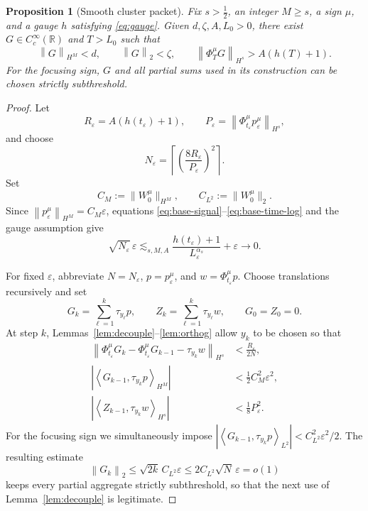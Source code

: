 \documentclass[10pt,a4paper]{amsart}
\numberwithin{equation}{section}
\newtheorem{proposition}[theorem]{Proposition}
\newcommand{\R}{\mathbb R}
\newcommand{\eps}{\varepsilon}
\newcommand{\half}{\frac12}
\newcommand{\norm}[1]{\left\lVert #1\right\rVert}
\newcommand{\abs}[1]{\left\lvert #1\right\rvert}
\newcommand{\ip}[2]{\left\langle #1,#2\right\rangle}
\newcommand{\flow}[1]{\Phi^{#1}}
\newcommand{\trans}[1]{\tau_{#1}}
\begin{document}
\begin{proposition}[Smooth cluster packet]\label{prop:cluster}
Fix $s>\half$, an integer $M\geq s$, a sign $\mu$, and a gauge $h$ satisfying
\eqref{eq:gauge}.  Given $d,\zeta,A,L_0>0$, there exist
$G\in C_c^\infty(\R)$ and $T>L_0$ such that
\begin{equation}\label{eq:cluster-properties}
 \norm G_{H^M}<d,
 \qquad
 \norm G_2<\zeta,
 \qquad
 \norm{\flow\mu_TG}_{H^s}>A(h(T)+1).
\end{equation}
For the focusing sign, $G$ and all partial sums used in its construction can
be chosen strictly subthreshold.
\end{proposition}

\begin{proof}
Let
\[
 R_\eps=A(h(t_\eps)+1),
 \qquad
 P_\eps=\norm{\flow\mu_{t_\eps}p_\eps^\mu}_{H^s},
\]
and choose
\begin{equation}\label{eq:N-cluster}
 N_\eps=\left\lceil
 \left(\frac{8R_\eps}{P_\eps}\right)^2
 \right\rceil.
\end{equation}
Set
\[
 C_M:=\|W_0^\mu\|_{H^M},\qquad C_{L^2}:=\|W_0^\mu\|_2.
\]
Since $\norm{p_\eps^\mu}_{H^M}=C_M\eps$, equations
\eqref{eq:base-signal}--\eqref{eq:base-time-log} and the gauge assumption give
\begin{equation}\label{eq:cluster-cost}
 \sqrt{N_\eps}\,\eps
 \lesssim_{s,M,A}
 \frac{h(t_\eps)+1}{L_\eps^{\alpha_s}}+\eps
 \longrightarrow0.
\end{equation}

For fixed $\eps$, abbreviate $N=N_\eps$, $p=p_\eps^\mu$, and
$w=\flow\mu_{t_\eps}p$.  Choose translations recursively and set
\[
 G_k=\sum_{\ell=1}^k\trans{y_\ell}p,\qquad
 Z_k=\sum_{\ell=1}^k\trans{y_\ell}w,\qquad G_0=Z_0=0.
\]
At step $k$, Lemmas~\ref{lem:decouple}--\ref{lem:orthog} allow $y_k$ to be
chosen so that
\begin{align}
 \norm{\flow\mu_{t_\eps}G_k-\flow\mu_{t_\eps}G_{k-1}
 -\trans{y_k}w}_{H^s}
 &<\frac{R_\eps}{2N},\label{eq:cluster-step-flow}\\
 \abs{\ip{G_{k-1}}{\trans{y_k}p}_{H^M}}
 &<\frac12 C_M^2\eps^2,\label{eq:cluster-step-initial}\\
 \abs{\ip{Z_{k-1}}{\trans{y_k}w}_{H^s}}
 &<\frac18P_\eps^2.\label{eq:cluster-step-terminal}
\end{align}
For the focusing sign we simultaneously impose
$|\ip{G_{k-1}}{\trans{y_k}p}_{L^2}|<C_{L^2}^2\eps^2/2$.  The resulting estimate
\[
 \norm{G_k}_2\leq\sqrt{2k}\,C_{L^2}\eps
 \leq2C_{L^2}\sqrt N\,\eps=o(1)
\]
keeps every partial aggregate strictly subthreshold, so that the next use of
Lemma~\ref{lem:decouple} is legitimate.


\end{proof}
\end{document}
